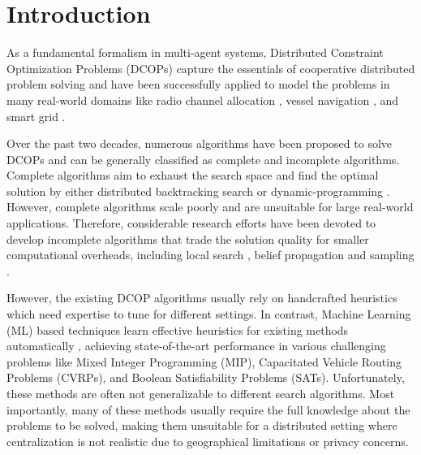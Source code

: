 \documentclass[letterpaper]{article} %
\begin{document}
\section{Introduction}
As a fundamental formalism in multi-agent systems, Distributed Constraint Optimization Problems (DCOPs) \cite{modi2005adopt} capture the essentials of cooperative distributed problem solving and have been successfully applied to model the problems in many real-world domains like radio channel allocation \cite{monteiro2012multi}, vessel navigation \cite{hirayama2019dssa+}, and smart grid \cite{fioretto2017distributed}.

Over the past two decades, numerous algorithms have been proposed to solve DCOPs and can be generally classified as complete and incomplete algorithms. Complete algorithms aim to exhaust the search space and find the optimal solution by either distributed backtracking search \cite{hirayamay97,modi2005adopt,litov2017forward,yeoh2010bnb} or dynamic-programming \cite{chen2020rmb,petcuscalable,petcu2007mb}. However, complete algorithms scale poorly and are unsuitable for large real-world applications. Therefore, considerable research efforts have been devoted to develop incomplete algorithms that trade the solution quality for smaller computational overheads, including local search \cite{maheswaran2004distributed,okamoto2016distributed,Zhang2005Distributed}, belief propagation \cite{cohen2020governing,farinelli2008decentralised,rogers2011bounded,zivan2017balancing,chenDWH18} and sampling \cite{nguyen2019distributed,ottens2017duct}.

However, the existing DCOP algorithms usually rely on handcrafted heuristics which need expertise to tune for different settings. In contrast, Machine Learning (ML) based techniques learn effective heuristics for existing methods automatically \cite{bengio2021machine,gasseCFC019,Lederman2020Learning}, achieving state-of-the-art performance in various challenging problems like Mixed Integer Programming (MIP), Capacitated Vehicle Routing Problems (CVRPs), and Boolean Satisfiability Problems (SATs). Unfortunately, these methods are often not generalizable to different search algorithms. Most importantly, many of these methods usually require the full knowledge about the problems to be solved, making them unsuitable for a distributed setting where centralization is not realistic due to geographical limitations or privacy concerns.
\end{document}
